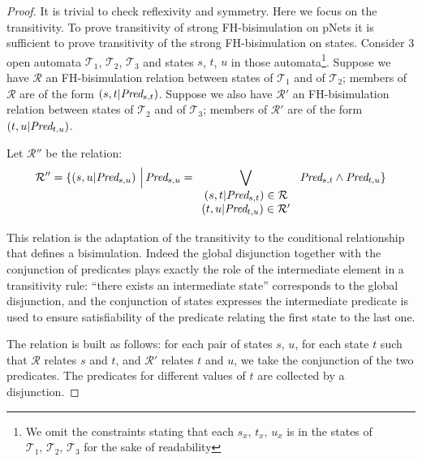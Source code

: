 \documentclass{lncs/llncs}
\begin{document}
              \begin{proof}
       	
       	It is trivial to check reflexivity and symmetry. Here we focus on the
       	transitivity. 
       	To prove transitivity of strong FH-bisimulation on pNets it is sufficient to 
       	prove 
       	transitivity of the strong FH-bisimulation on states. Consider 3 open automata 
       	$\mathcal{T}_1$, $\mathcal{T}_2$, $\mathcal{T}_3$ and states $s$, $t$, $u$ 
       	in those 
       	automata\footnote{We omit the constraints stating that each $s_x,\,t_x,\,u_x$ is 
       	in the 
       	states of 
       		$\mathcal{T}_1,\,\mathcal{T}_2,\,\mathcal{T}_3$ for the sake of readability}.
       	Suppose we have $\mathcal{R}$ an FH-bisimulation relation between states of 
       	$\mathcal{T}_1$ and of  $\mathcal{T}_2$; members of $\mathcal{R}$ are of the form 
       	$(s,t|\Pred_{s,t})$.
       	Suppose we also  have $\mathcal{R}'$ an FH-bisimulation relation between states 
       	of 
       	$\mathcal{T}_2$ and of  $\mathcal{T}_3$; members of $\mathcal{R}'$ are of the 
       	form 
       	$(t,u|\Pred_{t,u})$.
       	
       	Let $\mathcal{R}''$ be the relation: 
       	\[\mathcal{R}'' = 
       	\{(s,u|\Pred_{s,u})\,\,\Big|\,\Pred_{s,u}=\bigvee_{\begin{array}{c}       		
       		(s,t|\Pred_{s,t})\in\mathcal{R}\\ (t,u|\Pred_{t,u})\in\mathcal{R}' 	
       		\end{array}
       	}\,\Pred_{s,t}\land\Pred_{t,u}\}\]

This relation is the adaptation of the transitivity to the conditional relationship that 
defines a bisimulation. Indeed the global disjunction together with the conjunction of 
predicates plays exactly the role of the intermediate element in a transitivity rule: 
``there exists an intermediate state'' corresponds to the global disjunction, and the 
conjunction of states expresses the intermediate predicate is used to ensure 
satisfiability of the predicate relating the first state to the last one.
       	
       	The relation is built as follows: for each pair of states $s$, $u$, for each 
       	state 
       	$t$ such that $\mathcal{R}$ relates $s$ and $t$, and $\mathcal{R}'$ relates 
       	$t$ 
       	and $u$, we take the conjunction of the two predicates. The predicates for 
       	different 
       	values of $t$ are collected by a disjunction. 
       	

\end{proof}
\end{document}

